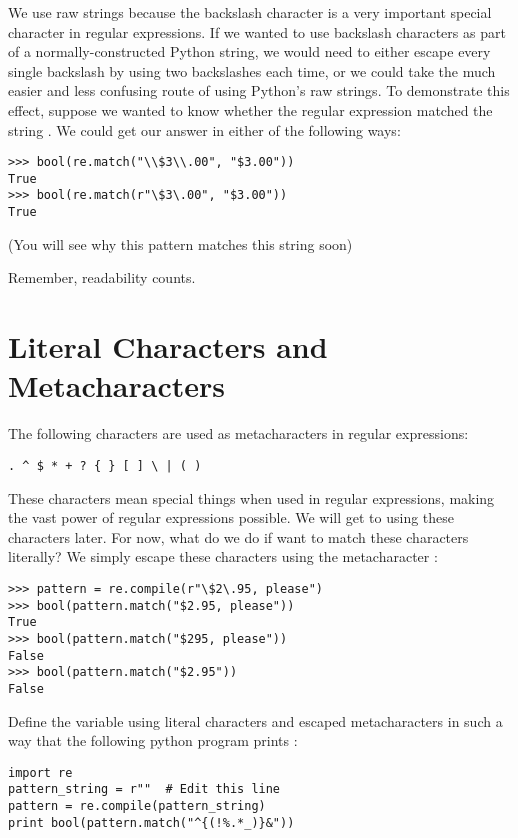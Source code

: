 We use raw strings because the backslash character is a very important special character in regular expressions. If we wanted to use backslash characters as part of a normally-constructed Python string, we would need to either escape every single backslash by using two backslashes each time, or we could take the much easier and less confusing route of using Python's raw strings.
To demonstrate this effect, suppose we wanted to know whether the regular expression  matched the string . We could get our answer in either of the following ways:
\begin{lstlisting}
>>> bool(re.match("\\$3\\.00", "$3.00"))
True
>>> bool(re.match(r"\$3\.00", "$3.00"))
True
\end{lstlisting}
(You will see why this pattern matches this string soon)

Remember, readability counts.

\section*{Literal Characters and Metacharacters}
The following characters are used as metacharacters in regular expressions:
\begin{lstlisting}
. ^ $ * + ? { } [ ] \ | ( )
\end{lstlisting}
These characters mean special things when used in regular expressions, making the vast power of regular expressions possible.
We will get to using these characters later. For now, what do we do if want to match these characters literally?
We simply escape these characters using the metacharacter :
\begin{lstlisting}
>>> pattern = re.compile(r"\$2\.95, please")
>>> bool(pattern.match("$2.95, please"))
True
>>> bool(pattern.match("$295, please"))
False
>>> bool(pattern.match("$2.95"))
False
\end{lstlisting}
\begin{problem}
Define the variable  using literal characters and escaped metacharacters in such a way that the following python program prints :
\begin{lstlisting}
import re
pattern_string = r""  # Edit this line
pattern = re.compile(pattern_string)
print bool(pattern.match("^{(!%.*_)}&"))
\end{lstlisting}
\end{problem}

